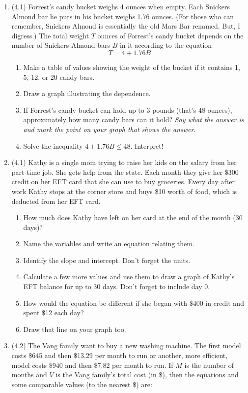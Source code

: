 \documentclass[12pt]{article}
\begin{document}
\begin{enumerate}
\item (4.1) Forrest's candy bucket weighs 4 ounces when empty.  Each Snickers Almond bar he puts in his bucket weighs 1.76 ounces.  (For those who can remember, Snickers Almond is essentially the old Mars Bar renamed.  But, I digress.)  The total weight $T$ ounces of Forrest's candy bucket depends on the number of Snickers Almond bars $B$ in it according to the equation $$T=4+1.76B$$
\begin{enumerate}
\item Make a table of values showing the weight of the bucket if it contains 1, 5, 12, or 20 candy bars.
\item Draw a graph illustrating the dependence.  
\item If Forrest's candy bucket can hold up to 3 pounds (that's 48 ounces), approximately how many candy bars can it hold? 
\emph{Say what the answer is and mark the point on your graph that shows the answer.}
 \item Solve the inequality $4+1.76B \le 48$.  Interpret!
\end{enumerate}

\item (4.1) Kathy is a single mom trying to raise her kids on the salary from her part-time job.  She gets help from the state. Each month they give her \$300 credit on her EFT card that she can use to buy groceries.  Every day after work Kathy stops at the corner store and buys \$10 worth of food, which is deducted from her EFT card.
\begin{enumerate}
\item How much does Kathy have left on her card at the end of the month (30 days)?
\item Name the variables and write an equation relating them.
\item Identify the slope and intercept.  Don't forget the units.
\item Calculate a few more values and use them to draw a graph of Kathy's EFT balance for up to 30 days.  Don't forget to include day 0.
\item How would the equation be different if she began with \$400 in credit and spent \$12 each day?  
\item Draw that line on your graph too.
\end{enumerate}

\item (4.2)  The Vang family want to buy a new washing machine.  The first model costs \$645 and then \$13.29 per month to run or another, more efficient, model costs \$940 and then \$7.82 per month to run.  If $M$ is the number of months and $V$  is the Vang family's total cost  (in \$), then the equations and some comparable values (to the nearest \$) are:


\end{enumerate}
\end{document}
